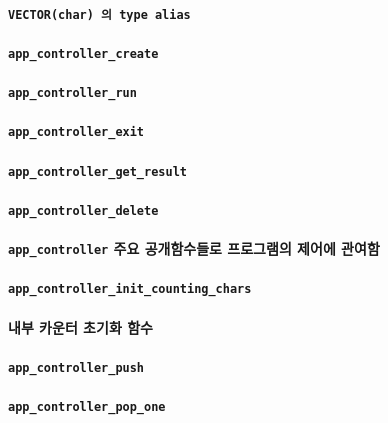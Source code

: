 \documentclass[UTF8]{report}
\begin{document}
            \paragraph{%
                \normalfont \texttt{VECTOR(char) 의 type alias}
            }


            \paragraph{\texttt{app\_controller\_create}}
            \paragraph{\texttt{app\_controller\_run}}
            \paragraph{\texttt{app\_controller\_exit}}
            \paragraph{\texttt{app\_controller\_get\_result}}
            \paragraph{\texttt{app\_controller\_delete}}
            \paragraph{%
                \normalfont \texttt{app\_controller} 주요 공개함수들로 프로그램의 제어에 관여함
            }

            \paragraph{\texttt{app\_controller\_init\_counting\_chars}}
            \paragraph{%
                \normalfont 내부 카운터 초기화 함수
            }

            \paragraph{\texttt{app\_controller\_push}}
            \paragraph{\texttt{app\_controller\_pop\_one}}
\end{document}
